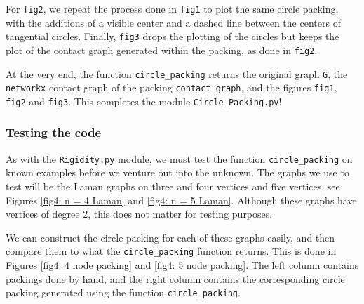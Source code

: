 \begin{flushleft}
For \texttt{fig2}, we repeat the process done in \texttt{fig1} to plot the same circle packing, with the additions of a visible center and a dashed line between the centers of tangential circles. Finally, \texttt{fig3} drops the plotting of the circles but keeps the plot of the contact graph generated within the packing, as done in \texttt{fig2}.
\end{flushleft}

\begin{flushleft}
At the very end, the function \texttt{circle\_packing} returns the original graph \texttt{G}, the \texttt{networkx} contact graph of the packing \texttt{contact\_graph}, and the figures \texttt{fig1}, \texttt{fig2} and \texttt{fig3}. This completes the module \texttt{Circle\_Packing.py}!
\end{flushleft}

\subsubsection{Testing the code}

\begin{flushleft}
As with the \texttt{Rigidity.py} module, we must test the function \texttt{circle\_packing} on known examples before we venture out into the unknown. The graphs we use to test will be the Laman graphs on three and four vertices and five vertices, see Figures  \ref{fig4: n = 4 Laman} and \ref{fig4: n = 5 Laman}. Although these graphs have vertices of degree 2, this does not matter for testing purposes. 
\end{flushleft}

\begin{flushleft}
We can construct the circle packing for each of these graphs easily, and then compare them to what the \texttt{circle\_packing} function returns. This is done in Figures \ref{fig4: 4 node packing} and \ref{fig4: 5 node packing}. The left column contains packings done by hand, and the right column contains the corresponding circle packing generated using the function \texttt{circle\_packing}.
\end{flushleft}

